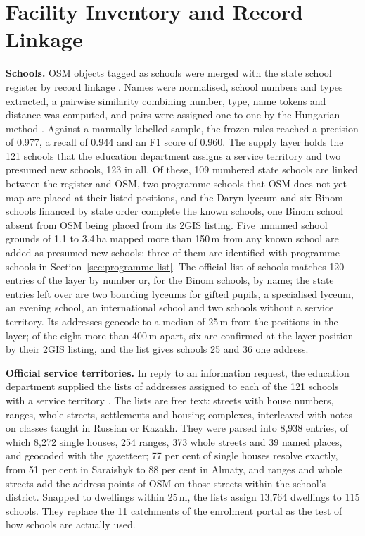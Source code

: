 \section{Facility Inventory and Record Linkage}
\label{sec:inventory}

\textbf{Schools.} OSM objects tagged as schools were merged with the state school register by record linkage \cite{fellegi1969}. Names were normalised, school numbers and types extracted, a pairwise similarity combining number, type, name tokens and distance was computed, and pairs were assigned one to one by the Hungarian method \cite{kuhn1955}. Against a manually labelled sample, the frozen rules reached a precision of 0.977, a recall of 0.944 and an F1 score of 0.960. The supply layer holds the 121 schools that the education department assigns a service territory \cite{catchments2026} and two presumed new schools, 123 in all. Of these, 109 numbered state schools are linked between the register and OSM, two programme schools that OSM does not yet map are placed at their listed positions, and the Daryn lyceum and six Binom schools financed by state order complete the known schools, one Binom school absent from OSM being placed from its 2GIS listing. Five unnamed school grounds of 1.1 to 3.4\,ha mapped more than 150\,m from any known school are added as presumed new schools; three of them are identified with programme schools in Section~\ref{sec:programme-list}. The official list of schools \cite{schoolregister2026} matches 120 entries of the layer by number or, for the Binom schools, by name; the state entries left over are two boarding lyceums for gifted pupils, a specialised lyceum, an evening school, an international school and two schools without a service territory. Its addresses geocode to a median of 25\,m from the positions in the layer; of the eight more than 400\,m apart, six are confirmed at the layer position by their 2GIS listing, and the list gives schools 25 and 36 one address.

\textbf{Official service territories.} \label{sec:catchments} In reply to an information request, the education department supplied the lists of addresses assigned to each of the 121 schools with a service territory \cite{catchments2026}. The lists are free text: streets with house numbers, ranges, whole streets, settlements and housing complexes, interleaved with notes on classes taught in Russian or Kazakh. They were parsed into 8,938 entries, of which 8,272 single houses, 254 ranges, 373 whole streets and 39 named places, and geocoded with the gazetteer; 77 per cent of single houses resolve exactly, from 51 per cent in Saraishyk to 88 per cent in Almaty, and ranges and whole streets add the address points of OSM on those streets within the school's district. Snapped to dwellings within 25\,m, the lists assign 13,764 dwellings to 115 schools. They replace the 11 catchments of the enrolment portal as the test of how schools are actually used.

